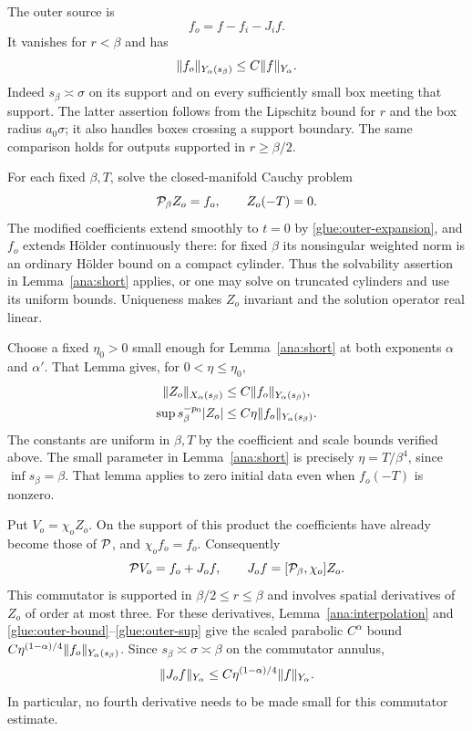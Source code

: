 The outer source is
\begin{equation}\label{glue:outer-source}
 f_o=f-f_i-J_i f.
\end{equation}
It vanishes for $r<\beta$ and has
\begin{equation}\label{glue:outer-source-bound}
 \lVert f_o\rVert_{Y_\alpha(s_\beta)}\le C\lVert f\rVert_{Y_\alpha}.
\end{equation}
Indeed $s_\beta\asymp\sigma$ on its support and on every sufficiently
small box meeting that support.  The latter assertion follows from
the Lipschitz bound for $r$ and the box radius $a_0\sigma$; it also
handles boxes crossing a support boundary.  The same comparison holds
for outputs supported in $r\ge\beta/2$.

For each fixed $\beta,T$, solve the closed-manifold Cauchy problem
\begin{equation}\label{glue:outer-cauchy}
 \mathcal P_\beta Z_o=f_o,\qquad Z_o(-T)=0.
\end{equation}
The modified coefficients extend smoothly to $t=0$ by
\eqref{glue:outer-expansion}, and $f_o$ extends H\"older continuously
there: for fixed $\beta$ its nonsingular weighted norm is an ordinary
H\"older bound on a compact cylinder.  Thus the solvability assertion
in Lemma~\ref{ana:short} applies, or one may solve on truncated
cylinders and use its uniform bounds.  Uniqueness makes $Z_o$ invariant
and the solution operator real linear.

Choose a fixed $\eta_0>0$ small enough for Lemma~\ref{ana:short}
at both exponents $\alpha$ and $\alpha'$.  That Lemma gives, for
$0<\eta\le\eta_0$,
\begin{align}
 \lVert Z_o\rVert_{X_\alpha(s_\beta)}
   &\le C\lVert f_o\rVert_{Y_\alpha(s_\beta)},\label{glue:outer-bound}\\
 \sup s_\beta^{-p_0}\lvert Z_o\rvert
   &\le C\eta\lVert f_o\rVert_{Y_\alpha(s_\beta)}.\label{glue:outer-sup}
\end{align}
The constants are uniform in $\beta,T$ by the coefficient and scale
bounds verified above.  The small parameter in Lemma~\ref{ana:short}
is precisely $\eta=T/\beta^4$, since $\inf s_\beta=\beta$.
That lemma applies to zero initial data even when $f_o(-T)$ is nonzero.

Put $V_o=\chi_o Z_o$.  On the support of this product the coefficients
have already become those of $\mathcal P$, and $\chi_o f_o=f_o$.
Consequently
\begin{equation}\label{glue:outer-identity}
 \mathcal P V_o=f_o+J_o f,\qquad
 J_o f=[\mathcal P_\beta,\chi_o]Z_o.
\end{equation}
This commutator is supported in $\beta/2\le r\le\beta$ and involves
spatial derivatives of $Z_o$ of order at most three.  For these
derivatives, Lemma~\ref{ana:interpolation} and
\eqref{glue:outer-bound}--\eqref{glue:outer-sup} give the scaled
parabolic $C^\alpha$ bound
$C\eta^{(1-\alpha)/4}\lVert f_o\rVert_{Y_\alpha(s_\beta)}$.
Since $s_\beta\asymp\sigma\asymp\beta$ on the commutator annulus,
\begin{equation}\label{glue:outer-error-small}
 \lVert J_o f\rVert_{Y_\alpha}
 \le C\eta^{(1-\alpha)/4}\lVert f\rVert_{Y_\alpha}.
\end{equation}
In particular, no fourth derivative needs to be made small for this
commutator estimate.

